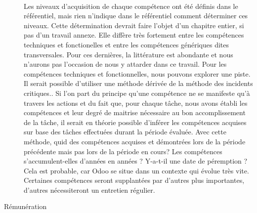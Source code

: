 \begin{description}
\paragraph{}Les niveaux d'acquisition de chaque compétence ont été définis dans le référentiel, mais rien n'indique dans le référentiel comment déterminer ces niveaux. Cette détermination devrait faire l'objet d'un chapitre entier, si pas d'un travail annexe. Elle diffère très fortement entre les compétences techniques et fonctionelles et entre les compétences génériques dites transversales. Pour ces dernières, la littérature est abondante et nous n'aurons pas l'occasion de nous y attarder dans ce travail. Pour les compétences techniques et fonctionnelles, nous pouvons explorer une piste. Il serait possible d'utiliser une méthode dérivée de la méthode des incidents critiques.\citep[pp.272]{gestionressourceshumaine2002}. Si l'on part du principe qu'une compétence ne se manifeste qu'à travers les actions\citep[pp.171]{gestionressourceshumaine2007} et du fait que, pour chaque tâche, nous avons établi les compétences et leur degré de maitrise nécessaire au bon accomplissement de la tâche, il serait en théorie possible d'inférer les compétences acquises sur base des tâches effectuées durant la période évaluée. Avec cette méthode, quid des compétences acquises et démontrées lors de la période précédente mais pas lors de la période en cours? Les compétences s'accumulent-elles d'années en années ? Y-a-t-il une date de péremption ? Cela est probable, car Odoo se situe dans un contexte qui évolue très vite. Certaines compétences seront supplantées par d'autres plus importantes, d'autres nécessiteront un entretien régulier. 
    \item[Rémunération]

\end{description}
